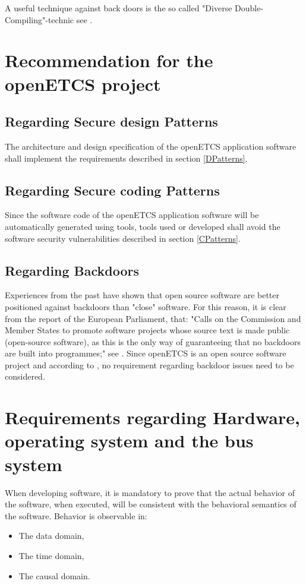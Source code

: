 \documentclass{template/openetcs_report}
\begin{document}
A useful technique against back doors is the so called "Diverse Double-Compiling"-technic see \cite{Wheeler09}. 


\section{Recommendation for the openETCS project}

\subsection{Regarding Secure design Patterns}
The architecture and design specification of the openETCS application software shall implement the requirements described in section \ref{DPatterns}.

\subsection{Regarding Secure coding Patterns}
Since the software code of the openETCS application software will be automatically generated using tools,  tools used or developed shall avoid the software security vulnerabilities described in section \ref{CPatterns}.

\subsection{Regarding Backdoors}
Experiences from the past have shown that open source software are better positioned against backdoors than "close" software. For this reason, it is clear from the report of the European Parliament, that: "Calls on the Commission and Member States to promote software projects whose source text is made public (open-source software), as this is the only way of guaranteeing that no backdoors are built into programmes;" see \cite{EUParl}.
Since openETCS is an open source software project and according to \cite{EUParl}, no requirement regarding backdoor issues need to be considered.


\section{Requirements regarding Hardware, operating system and the bus system}
When developing software, it is mandatory to prove that the actual behavior of the software, when executed, will be consistent with the behavioral semantics of the software. 
Behavior is observable in: 
\begin{itemize}\itemsep=0pt
  \item The data domain,
  \item The time domain,
  \item The causal domain.
\end{itemize}
\end{document}
